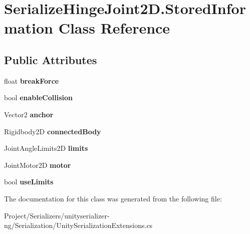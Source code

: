 \hypertarget{class_serialize_hinge_joint2_d_1_1_stored_information}{}\section{Serialize\+Hinge\+Joint2\+D.\+Stored\+Information Class Reference}
\label{class_serialize_hinge_joint2_d_1_1_stored_information}
\subsection*{Public Attributes}
\begin{DoxyCompactItemize}
\item 
\mbox{\label{class_serialize_hinge_joint2_d_1_1_stored_information_a1f6f75cc7759f5d9556ee62b23e8411d}} 
float {\bfseries break\+Force}
\item 
\mbox{\label{class_serialize_hinge_joint2_d_1_1_stored_information_ab2fc2f7243fc736013f3d95c03f8685d}} 
bool {\bfseries enable\+Collision}
\item 
\mbox{\label{class_serialize_hinge_joint2_d_1_1_stored_information_a3c4a84445a7c8d7d6f7d3ae85be78b65}} 
Vector2 {\bfseries anchor}
\item 
\mbox{\label{class_serialize_hinge_joint2_d_1_1_stored_information_aa0c9430366a66c6b30117412632a59cb}} 
Rigidbody2D {\bfseries connected\+Body}
\item 
\mbox{\label{class_serialize_hinge_joint2_d_1_1_stored_information_acb87d2266cc01d851fba7a9269cc2bfb}} 
Joint\+Angle\+Limits2D {\bfseries limits}
\item 
\mbox{\label{class_serialize_hinge_joint2_d_1_1_stored_information_a8d32337604a29bf04cc8cf6b65726861}} 
Joint\+Motor2D {\bfseries motor}
\item 
\mbox{\label{class_serialize_hinge_joint2_d_1_1_stored_information_ac53602b31e9d63e836d69b84d2dd8596}} 
bool {\bfseries use\+Limits}
\end{DoxyCompactItemize}


The documentation for this class was generated from the following file\+:\begin{DoxyCompactItemize}
\item 
Project/\+Serializers/unityserializer-\/ng/\+Serialization/Unity\+Serialization\+Extensions.\+cs\end{DoxyCompactItemize}
